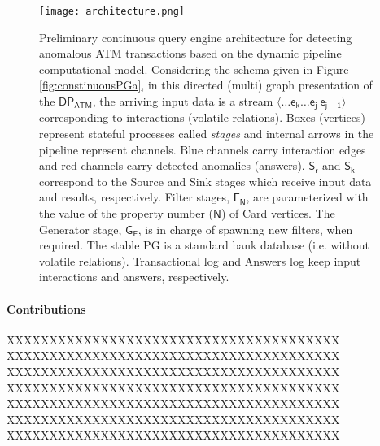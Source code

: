 \begin{figure}[t!]
         \centering
         \texttt{[image: architecture.png]}
         \caption{Preliminary continuous query engine architecture for detecting anomalous ATM transactions based on the dynamic pipeline computational model. Considering the schema given in Figure \ref{fig:constinuousPGa}, in this directed (multi) graph presentation of the $\mathsf{DP_{ATM}}$, the arriving input data is a stream  $\mathsf{\langle \dots e_k\dots e_j \: e_{j-1}\rangle}$ corresponding to \textsf{interactions} (volatile relations). Boxes (vertices) represent stateful processes called \emph{stages} and internal arrows in the pipeline represent channels. Blue channels carry interaction edges and red channels carry detected anomalies (answers).  $\mathsf{S_r}$ and $\mathsf{S_k}$ correspond to the \textsf{Source} and \textsf{Sink} stages which receive input data and results, respectively. \textsf{Filter} stages, $\mathsf{F_{N}}$, are parameterized with the value of the property \textsf{number} ($\mathsf{N}$) of \textsf{Card} vertices. The \textsf{Generator} stage, $\mathsf{G_F}$, is in charge of spawning new filters, when required. The stable PG is a standard bank database (i.e. without volatile relations). Transactional log and Answers log keep input interactions and answers, respectively.
         }
         \label{fig:DP_ATM}
\end{figure}
%


\paragraph{Contributions}
XXXXXXXXXXXXXXXXXXXXXXXXXXXXXXXXXXXXXXX
XXXXXXXXXXXXXXXXXXXXXXXXXXXXXXXXXXXXXXX
XXXXXXXXXXXXXXXXXXXXXXXXXXXXXXXXXXXXXXX
XXXXXXXXXXXXXXXXXXXXXXXXXXXXXXXXXXXXXXX
XXXXXXXXXXXXXXXXXXXXXXXXXXXXXXXXXXXXXXX
XXXXXXXXXXXXXXXXXXXXXXXXXXXXXXXXXXXXXXX
XXXXXXXXXXXXXXXXXXXXXXXXXXXXXXXXXXXXXXX
